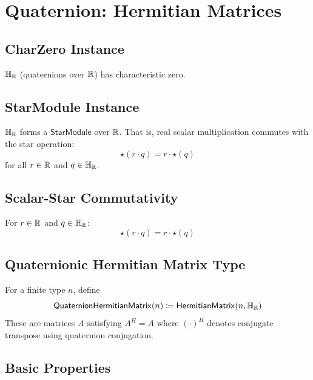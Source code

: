 \section{Quaternion: Hermitian Matrices}

\subsection{CharZero Instance}

\begin{proposition}
$\mathbb{H}_{\mathbb{R}}$ (quaternions over $\mathbb{R}$) has characteristic zero.
\end{proposition}

\subsection{StarModule Instance}

\begin{proposition}
$\mathbb{H}_{\mathbb{R}}$ forms a $\mathsf{StarModule}$ over $\mathbb{R}$. That is, real scalar multiplication commutes with the star operation:
\[ \star(r \cdot q) = r \cdot \star(q) \]
for all $r \in \mathbb{R}$ and $q \in \mathbb{H}_{\mathbb{R}}$.
\end{proposition}

\subsection{Scalar-Star Commutativity}

\begin{theorem}
For $r \in \mathbb{R}$ and $q \in \mathbb{H}_{\mathbb{R}}$:
\[ \star(r \cdot q) = r \cdot \star(q) \]
\end{theorem}

\subsection{Quaternionic Hermitian Matrix Type}

\begin{definition}[QuaternionHermitianMatrix]
For a finite type $n$, define
\[ \mathsf{QuaternionHermitianMatrix}(n) \coloneqq \mathsf{HermitianMatrix}(n, \mathbb{H}_{\mathbb{R}}) \]
These are matrices $A$ satisfying $A^H = A$ where $(\cdot)^H$ denotes conjugate transpose using quaternion conjugation.
\end{definition}

\subsection{Basic Properties}

